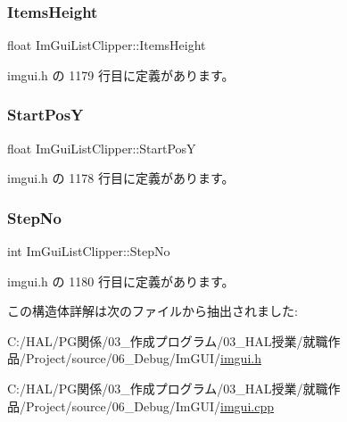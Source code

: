 \subsubsection{\texorpdfstring{Items\+Height}{ItemsHeight}}
{\footnotesize\ttfamily float Im\+Gui\+List\+Clipper\+::\+Items\+Height}



 imgui.\+h の 1179 行目に定義があります。

\mbox{\label{struct_im_gui_list_clipper_affee91b338520cd4bd59b5b680dcb5ae}} 
\subsubsection{\texorpdfstring{Start\+PosY}{StartPosY}}
{\footnotesize\ttfamily float Im\+Gui\+List\+Clipper\+::\+Start\+PosY}



 imgui.\+h の 1178 行目に定義があります。

\mbox{\label{struct_im_gui_list_clipper_a8fe78f0368e16425c33fd35ca45d1912}} 
\subsubsection{\texorpdfstring{Step\+No}{StepNo}}
{\footnotesize\ttfamily int Im\+Gui\+List\+Clipper\+::\+Step\+No}



 imgui.\+h の 1180 行目に定義があります。



この構造体詳解は次のファイルから抽出されました\+:\begin{DoxyCompactItemize}
\item 
C\+:/\+H\+A\+L/\+P\+G関係/03\+\_\+作成プログラム/03\+\_\+\+H\+A\+L授業/就職作品/\+Project/source/06\+\_\+\+Debug/\+Im\+G\+U\+I/\mbox{\hyperlink{imgui_8h}{imgui.\+h}}\item 
C\+:/\+H\+A\+L/\+P\+G関係/03\+\_\+作成プログラム/03\+\_\+\+H\+A\+L授業/就職作品/\+Project/source/06\+\_\+\+Debug/\+Im\+G\+U\+I/\mbox{\hyperlink{imgui_8cpp}{imgui.\+cpp}}\end{DoxyCompactItemize}
